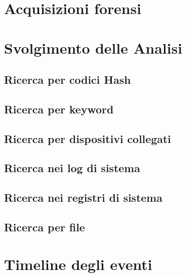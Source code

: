\documentclass[a4paper,12pt]{report}
\begin{document}
\pagebreak

\chapter{Acquisizioni forensi}


\pagebreak

\chapter{Svolgimento delle Analisi}


\section{Ricerca per codici Hash}


\section{Ricerca per keyword}


\section{Ricerca per dispositivi collegati}


\section{Ricerca nei log di sistema}


\section{Ricerca nei registri di sistema}


\section{Ricerca per file}


\pagebreak

\chapter{Timeline degli eventi}




\end{document}
